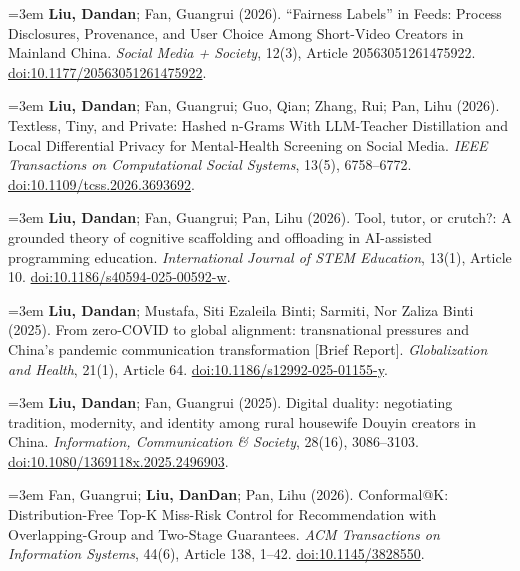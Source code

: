 \documentclass[a4paper,11pt]{article}
\newcommand{\publication}[2]{%
  \par\addvspace{8pt}\noindent
  \begin{minipage}{\linewidth}
    \fontsize{10.8}{13.4}\selectfont\raggedright
    \hangindent=3em\hangafter=1
    \makebox[3em][l]{\textcolor{teal}{[#1]}}#2
  \end{minipage}\par}
\begin{document}
\publication{J2}{\textbf{Liu, Dandan}; Fan, Guangrui (2026). “Fairness Labels” in Feeds: Process Disclosures, Provenance, and User Choice Among Short-Video Creators in Mainland China. \emph{Social Media + Society}, 12(3), Article 20563051261475922. \href{https://doi.org/10.1177/20563051261475922}{doi:10.1177/20563051261475922}.}

\publication{J3}{\textbf{Liu, Dandan}; Fan, Guangrui; Guo, Qian; Zhang, Rui; Pan, Lihu (2026). Textless, Tiny, and Private: Hashed n-Grams With LLM-Teacher Distillation and Local Differential Privacy for Mental-Health Screening on Social Media. \emph{IEEE Transactions on Computational Social Systems}, 13(5), 6758--6772. \href{https://doi.org/10.1109/tcss.2026.3693692}{doi:10.1109/tcss.2026.3693692}.}

\publication{J4}{\textbf{Liu, Dandan}; Fan, Guangrui; Pan, Lihu (2026). Tool, tutor, or crutch?: A grounded theory of cognitive scaffolding and offloading in AI-assisted programming education. \emph{International Journal of STEM Education}, 13(1), Article 10. \href{https://doi.org/10.1186/s40594-025-00592-w}{doi:10.1186/s40594-025-00592-w}.}

\publication{J5}{\textbf{Liu, Dandan}; Mustafa, Siti Ezaleila Binti; Sarmiti, Nor Zaliza Binti (2025). From zero-COVID to global alignment: transnational pressures and China's pandemic communication transformation [Brief Report]. \emph{Globalization and Health}, 21(1), Article 64. \href{https://doi.org/10.1186/s12992-025-01155-y}{doi:10.1186/s12992-025-01155-y}.}

\publication{J6}{\textbf{Liu, Dandan}; Fan, Guangrui (2025). Digital duality: negotiating tradition, modernity, and identity among rural housewife Douyin creators in China. \emph{Information, Communication \& Society}, 28(16), 3086--3103. \href{https://doi.org/10.1080/1369118x.2025.2496903}{doi:10.1080/1369118x.2025.2496903}.}

\publication{J7}{Fan, Guangrui; \textbf{Liu, DanDan}; Pan, Lihu (2026). Conformal@K: Distribution-Free Top-K Miss-Risk Control for Recommendation with Overlapping-Group and Two-Stage Guarantees. \emph{ACM Transactions on Information Systems}, 44(6), Article 138, 1--42. \href{https://doi.org/10.1145/3828550}{doi:10.1145/3828550}.}
\end{document}

